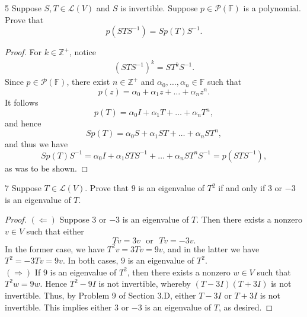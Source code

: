\documentclass{extarticle}
\newenvironment{problem}[1]{\begin{prob*}{#1}{}}{\end{prob*}}
\newcommand{\Z}{\mathbb{Z}}
\newcommand{\F}{\mathbb{F}}
\newcommand{\poly}{\mathcal{P}}
\newcommand{\Hom}{\mathcal{L}}
\begin{document}
\begin{problem}{5}
Suppose $S,T\in\Hom(V)$ and $S$ is invertible.  Suppose $p\in\poly(\F)$ is a polynomial.  Prove that 
\begin{equation*}
p\left(STS^{-1}\right) = Sp(T)S^{-1}.
\end{equation*}
\end{problem}
\begin{proof}
For $k\in\Z^+$, notice
\begin{align*}
\left(STS^{-1}\right)^k = ST^kS^{-1}.
\end{align*}
Since $p\in\poly(\F)$, there exist $n\in\Z^+$ and $\alpha_0,\dots,\alpha_n\in\F$ such that 
\begin{equation*}
p(z) = \alpha_0 + \alpha_1z + \dots + \alpha_n z^n. 
\end{equation*}
It follows
\begin{equation*}
p(T) = \alpha_0 I  + \alpha_1T + \dots + \alpha_nT^n,
\end{equation*}
and hence
\begin{equation*}
Sp(T) = \alpha_0 S + \alpha_1ST + \dots + \alpha_n ST^n,
\end{equation*}
and thus we have
\begin{equation*}
Sp(T)S^{-1} = \alpha_0 I + \alpha_1 STS^{-1} + \dots + \alpha_n ST^nS^{-1} = p\left(STS^{-1}\right),
\end{equation*}
as was to be shown.
\end{proof}

\begin{problem}{7}
Suppose $T\in\Hom(V)$.  Prove that $9$ is an eigenvalue of $T^2$ if and only if $3$ or $-3$ is an eigenvalue of $T$.
\end{problem}
\begin{proof}
$(\Leftarrow)$ Suppose $3$ or $-3$ is an eigenvalue of $T$.  Then there exists a nonzero $v\in V$ such that either 
\begin{equation*}
Tv = 3v ~~~\text{or}~~~ Tv = -3v.
\end{equation*}
In the former case, we have $T^2v = 3Tv = 9v$, and in the latter we have $T^2 = -3Tv = 9v$.  In both cases, $9$ is an eigenvalue of $T^2$.\\
\indent $(\Rightarrow)$ If $9$ is an eigenvalue of $T^2$, then there exists a nonzero $w\in V$ such that $T^2w = 9w$.  Hence $T^2 - 9I$ is not invertible, whereby $(T - 3I)(T + 3I)$ is not invertible.  Thus, by Problem 9 of Section 3.D, either $T-3I$ or $T+3I$ is not invertible.  This implies either $3$ or $-3$ is an eigenvalue of $T$, as desired.
\end{proof}
\end{document}
